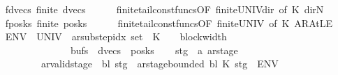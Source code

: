 \begin{isabellebody}
\isanewline
\ \ \isamarkupfalse%
\ fdvecs{\isacharcolon}{\kern0pt}\ {\isachardoublequoteopen}finite\ {\isacharquery}{\kern0pt}dvecs{\isachardoublequoteclose}\isanewline
\ \ \ \ \isamarkupfalse%
\ finite{\isacharunderscore}{\kern0pt}tail{\isacharunderscore}{\kern0pt}const{\isacharunderscore}{\kern0pt}funcs{\isacharbrackleft}{\kern0pt}OF\ finite{\isacharunderscore}{\kern0pt}UNIV{\isacharunderscore}{\kern0pt}dir{\isacharcomma}{\kern0pt}\ of\ K\ dir{\isachardot}{\kern0pt}N{\isacharbrackright}{\kern0pt}\ \isakeywordONE{{\isachardot}{\kern0pt}}\isamarkupfalse%
\isanewline
\ \ \isamarkupfalse%
\ fposks{\isacharcolon}{\kern0pt}\ {\isachardoublequoteopen}finite\ {\isacharquery}{\kern0pt}posks{\isachardoublequoteclose}\isanewline
\ \ \ \ \isamarkupfalse%
\ finite{\isacharunderscore}{\kern0pt}tail{\isacharunderscore}{\kern0pt}const{\isacharunderscore}{\kern0pt}funcs{\isacharbrackleft}{\kern0pt}OF\ finite{\isacharunderscore}{\kern0pt}UNIV{\isacharcomma}{\kern0pt}\ of\ K\ AR{\isacharunderscore}{\kern0pt}AtLE{\isacharbrackright}{\kern0pt}\ \isakeywordONE{{\isachardot}{\kern0pt}}\isamarkupfalse%
\isanewline
\ \ \isamarkupfalse%
\ {\isacharquery}{\kern0pt}ENV\ {\isacharequal}{\kern0pt}\ {\isachardoublequoteopen}{\isacharparenleft}{\kern0pt}UNIV\ {\isacharcolon}{\kern0pt}{\isacharcolon}{\kern0pt}\ ar{\isacharunderscore}{\kern0pt}substep{\isacharunderscore}{\kern0pt}idx\ set{\isacharparenright}{\kern0pt}\ {\isasymtimes}\ {\isacharbraceleft}{\kern0pt}{\isachardot}{\kern0pt}{\isachardot}{\kern0pt}K{\isacharbraceright}{\kern0pt}\ {\isasymtimes}\ {\isacharbraceleft}{\kern0pt}{\isachardot}{\kern0pt}{\isachardot}{\kern0pt}{\isacharless}{\kern0pt}{}\ {\isacharasterisk}{\kern0pt}\ block{\isacharunderscore}{\kern0pt}width\ {\isasymGamma}{\isacharbraceright}{\kern0pt}\isanewline
\ \ \ \ \ \ \ \ \ \ \ \ \ \ \ \ {\isasymtimes}\ {\isacharquery}{\kern0pt}bufs\ {\isasymtimes}\ {\isacharquery}{\kern0pt}dvecs\ {\isasymtimes}\ {\isacharquery}{\kern0pt}posks{\isachardoublequoteclose}\isanewline
\ \ \isamarkupfalse%
\ {\isachardoublequoteopen}{\isacharbraceleft}{\kern0pt}stg\ {\isacharcolon}{\kern0pt}{\isacharcolon}{\kern0pt}\ {\isacharprime}{\kern0pt}a\ ar{\isacharunderscore}{\kern0pt}stage{\isachardot}{\kern0pt}\isanewline
\ \ \ \ \ \ \ \ \ \ \ ar{\isacharunderscore}{\kern0pt}valid{\isacharunderscore}{\kern0pt}stage\ {\isasymGamma}\ bl\ stg\ {\isasymand}\ ar{\isacharunderscore}{\kern0pt}stage{\isacharunderscore}{\kern0pt}bounded\ bl\ K\ stg{\isacharbraceright}{\kern0pt}\ {\isasymsubseteq}\ {\isacharquery}{\kern0pt}ENV{\isachardoublequoteclose}\isanewline

\end{isabellebody}
